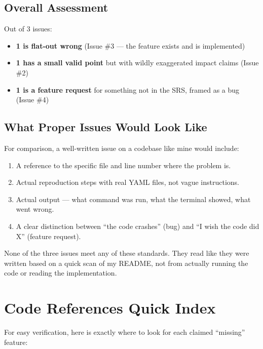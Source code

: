 \documentclass[12pt,a4paper]{article}
\begin{document}
\subsection{Overall Assessment}

Out of 3 issues:
\begin{itemize}
  \item \textbf{1 is flat-out wrong} (Issue \#3 --- the feature exists and is implemented)
  \item \textbf{1 has a small valid point} but with wildly exaggerated impact claims (Issue \#2)
  \item \textbf{1 is a feature request} for something not in the SRS, framed as a bug (Issue \#4)
\end{itemize}

\subsection{What Proper Issues Would Look Like}

For comparison, a well-written issue on a codebase like mine would include:
\begin{enumerate}
  \item A reference to the specific file and line number where the problem is.
  \item Actual reproduction steps with real YAML files, not vague instructions.
  \item Actual output --- what command was run, what the terminal showed, what went wrong.
  \item A clear distinction between ``the code crashes'' (bug) and ``I wish the code did X'' (feature request).
\end{enumerate}

None of the three issues meet any of these standards. They read like they were written based on a quick scan of my README, not from actually running the code or reading the implementation.

\newpage

\section{Code References Quick Index}

For easy verification, here is exactly where to look for each claimed ``missing'' feature:
\end{document}
